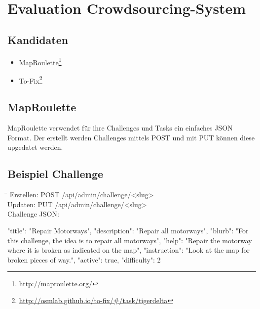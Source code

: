 \section{Evaluation Crowdsourcing-System}
\subsection{Kandidaten}
\begin{itemize}
	\item MapRoulette\footnote{\url{http://maproulette.org/}} 
	\item To-Fix\footnote{\url{http://osmlab.github.io/to-fix/\#/task/tigerdelta}}
\end{itemize}

\subsection{MapRoulette}
MapRoulette verwendet für ihre Challenges und Tasks ein einfaches JSON Format. Der erstellt werden Challenges mittels POST und mit PUT können diese upgedatet werden.

\subsection*{Beispiel Challenge}
\begin{tabbing}
    \hspace*{2cm}\=\hspace*{3cm}\= \kill
    Erstellen: \> POST /api/admin/challenge/<slug>  \\
    Updaten: \> PUT /api/admin/challenge/<slug> \\
    Challenge JSON: \\
\end{tabbing}		
\begin{python}
{
  "title": "Repair Motorways",
  "description": "Repair all motorways",
  "blurb": "For this challenge, the idea is to repair all motorways",
  "help": "Repair the motorway where it is broken as indicated on the map",
  "instruction": "Look at the map for broken pieces of way.",
  "active": true,
  "difficulty": 2
}
\end{python}